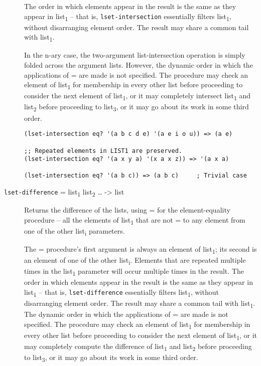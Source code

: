 \begin{description}
The order in which elements appear in the result is the same as they
appear in list\textsubscript{1} -- that is, \texttt{lset-intersection}
essentially filters list\textsubscript{1}, without disarranging element
order. The result may share a common tail with list\textsubscript{1}.

In the n-ary case, the two-argument list-intersection operation is
simply folded across the argument lists. However, the dynamic order in
which the applications of = are made is not specified. The procedure may
check an element of list\textsubscript{1} for membership in every other
list before proceeding to consider the next element of
list\textsubscript{1}, or it may completely intersect
list\textsubscript{1} and list\textsubscript{2} before proceeding to
list\textsubscript{3}, or it may go about its work in some third order.

\begin{verbatim}
(lset-intersection eq? '(a b c d e) '(a e i o u)) => (a e)

;; Repeated elements in LIST1 are preserved.
(lset-intersection eq? '(a x y a) '(x a x z)) => '(a x a)

(lset-intersection eq? '(a b c)) => (a b c)     ; Trivial case
\end{verbatim}
\item[ \href{}{} \texttt{lset-difference} = list\textsubscript{1}
list\textsubscript{2} \ldots{} -\textgreater{} list ]
Returns the difference of the lists, using = for the element-equality
procedure -- all the elements of list\textsubscript{1} that are not = to
any element from one of the other list\textsubscript{i} parameters.

The = procedure's first argument is always an element of
list\textsubscript{1}; its second is an element of one of the other
list\textsubscript{i}. Elements that are repeated multiple times in the
list\textsubscript{1} parameter will occur multiple times in the result.
The order in which elements appear in the result is the same as they
appear in list\textsubscript{1} -- that is, \texttt{lset-difference}
essentially filters list\textsubscript{1}, without disarranging element
order. The result may share a common tail with list\textsubscript{1}.
The dynamic order in which the applications of = are made is not
specified. The procedure may check an element of list\textsubscript{1}
for membership in every other list before proceeding to consider the
next element of list\textsubscript{1}, or it may completely compute the
difference of list\textsubscript{1} and list\textsubscript{2} before
proceeding to list\textsubscript{3}, or it may go about its work in some
third order.


\end{description}
